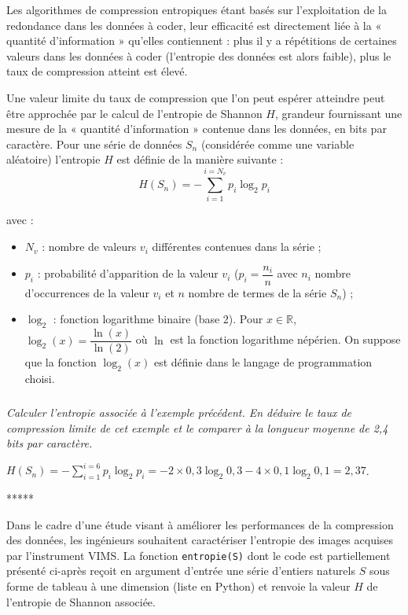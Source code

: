 \documentclass[10pt,fleqn]{article} %
\begin{document}
\ifprof
\else

Les algorithmes de compression entropiques étant basés sur l'exploitation de la redondance
dans les données à coder, leur efficacité est directement liée à la « quantité d'information »
qu'elles contiennent : plus il y a répétitions de certaines valeurs dans les données à coder
(l'entropie des données est alors faible), plus le taux de compression atteint est élevé.

Une valeur limite du taux de compression que l'on peut espérer atteindre peut être approchée
par le calcul de l'entropie de Shannon $H$, grandeur fournissant une mesure de la « quantité
d'information » contenue dans les données, en bits par caractère. Pour une série de données $S_n$
(considérée comme une variable aléatoire) l'entropie $H$ est définie de la manière suivante :
$$
H\left(S_n\right)=-\sum\limits_{i=1}^{i=N_v} p_i \log_2 p_i
$$

avec :
\begin{itemize}
\item $N_v$ : nombre de valeurs $v_i$ différentes contenues dans la série ;
\item $p_i$ : probabilité d'apparition de la valeur $v_i$ ($p_i = \dfrac{n_i}{n}$ avec $n_i$ nombre d'occurrences de la valeur $v_i$ et $n$ nombre de termes de la série $S_n$) ;
\item $\log_2$ : fonction logarithme binaire (base 2). Pour $x\in \mathbb{R}$, $\log_2(x) = \dfrac{\ln(x)}{\ln(2)}$ où $\ln$ est la fonction logarithme népérien. On suppose que la fonction $\log_2(x)$ est définie dans le langage de
programmation choisi.
\end{itemize}

\fi
\subparagraph{}\textit{Calculer l'entropie associée à l'exemple précédent. En déduire le taux de compression limite
de cet exemple et le comparer à la longueur moyenne de 2,4 bits par caractère.}
\ifprof
\begin{corrige}
$H\left(S_n\right)=-\sum\limits_{i=1}^{i=6} p_i \log_2 p_i
=-2\times 0,3\log_2 0,3- 4\times 0,1\log_2 0,1=2,37$.

*****

\end{corrige}
\else
\fi


\ifprof
\else

\vspace{.5cm}

Dans le cadre d'une étude visant à améliorer les performances de la compression des données,
les ingénieurs souhaitent caractériser l'entropie des images acquises par l'instrument VIMS.
La fonction \texttt{entropie(S)} dont le code est partiellement présenté ci-après reçoit en argument
d'entrée une série d'entiers naturels $S$ sous forme de tableau à une dimension (liste en Python)
et renvoie la valeur $H$ de l'entropie de Shannon associée.
\end{document}
